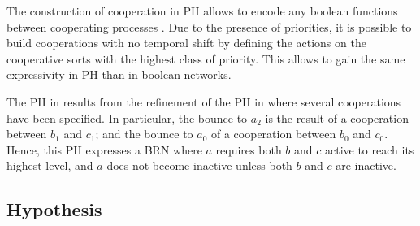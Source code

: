 The construction of cooperation in PH allows to encode any boolean functions between cooperating processes \cite{PMR10-TCSB}.
Due to the presence of priorities, it is possible to build cooperations with no temporal shift by defining the actions on the cooperative sorts with the highest class of priority.
This allows to gain the same expressivity in PH than in boolean networks.

\begin{example}
The PH in  results from the refinement of the PH in 
where several cooperations have been specified.
In particular, the bounce to $a_2$ is the result of a cooperation between $b_1$ and $c_1$; and the
bounce to $a_0$ of a cooperation between $b_0$ and $c_0$.
Hence, this PH expresses a BRN where $a$ requires both $b$ and $c$ active to reach its
highest level, and $a$ does not become inactive unless both $b$ and $c$ are inactive.
\end{example}

\subsection{Hypothesis} 


\begin{comment}
We define the set of chains of actions $\PHh^n(b, a)$ between two sorts $b$ and $a$, with $n \in \segm{1}{k}$, as below:
\begin{align*}
\PHh^n(b, a) = \{ (h_i)_{i \in \segm{0}{s}} \in (\restriction{\PHh}{n})^{s+1} &\mid s \in \sN, \PHsort(\PHhitter(h_0)) = b \wedge \PHsort(\PHtarget(h_s)) = a \\
  & \wedge \forall i \in \segm{1}{s}, \PHsort(\PHtarget(h_{i-1})) = \PHsort(\PHhitter(h_{i})) \}
\end{align*}

We define the neighbor \towrite{Revoir terminologie : “neighborhood” ? “vicinity” ?} sorts of any sort $a$ and $n \in \segm{1}{k}$ as :
$$
\Vs^n(a) = \{ b \in \PHs \mid \PHh^m(b, a) \neq \emptyset \wedge m = \min(n, \prio(a)) \} \cup \{ a \}
$$

And, as a shortcut:
$$
\Vs(a) = \Vs^{\prio(a)}(a)
$$

We define the neighbor actions of any sort $a$ as :
$$
\Vh(a) = \{ h \in \restriction{\PHh}{\prio(a)} \mid \{ \PHsort(\PHhitter(h)), \PHsort(\PHtarget(h)) \} \subset \Vs(a) \wedge \prio(h) \leq \prio(a) \}
$$
\end{comment}

